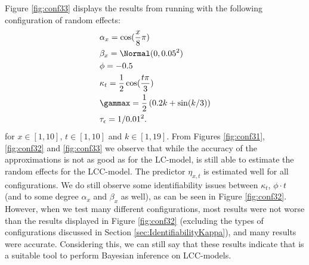 Figure \ref{fig:conf33} displays the results from running \inlabru with the following configuration of random effects:
\begin{equation}
    \begin{aligned}
        &\alpha_x = \cos(\frac{x}{8}\pi)\\
        &\beta_x = \Normal(0,0.05^2)\\
        &\phi = -0.5\\
        &\kappa_t = \frac{1}{2}\cos(\frac{t\pi}{3})\\
        &\gammax = \frac{1}{2}\left( 0.2k + \sin(k/3)\right)\\
        &\tau_{\epsilon} = 1/0.01^2.
    \end{aligned}
    \label{eq:conf33}
\end{equation}
for $x\in[1,10]$, $t \in [1,10]$ and $k \in [1,19]$. 
From Figures \ref{fig:conf31}, \ref{fig:conf32} and \ref{fig:conf33} we observe that while the accuracy of the approximations is not as good as for the LC-model, \inlabru is still able to estimate the random effects for the LCC-model. The predictor $\eta_{x,t}$ is estimated well for all configurations. We do still observe some identifiability issues between $\kappa_t$, $\phi \cdot t$ (and to some degree $\alpha_x$ and $\beta_x$ as well), as can be seen in Figure \ref{fig:conf32}. However, when we test many different configurations, most results were not worse than the results displayed in Figure \ref{fig:conf32} (excluding the types of configurations discussed in Section \ref{sec:IdentifiabilityKappa}), and many results were accurate.  Considering this, we can still say that these results indicate that \inlabru is a suitable tool to perform Bayesian inference on LCC-models. 
